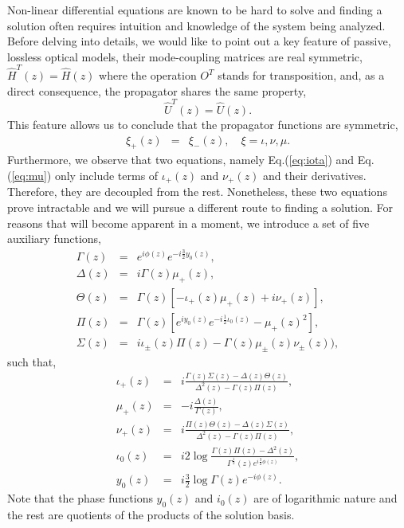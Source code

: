 \documentclass[9pt,twocolumn,twoside]{osajnl}
\begin{document}
Non-linear differential equations are known to be hard to solve and finding a solution 
often requires intuition and knowledge of the system being analyzed. 
Before delving into details, we would like to point out a key feature of passive, lossless optical models, their mode-coupling matrices are real symmetric, $\hat{H}^{T}(z) = \hat{H}(z)$ where the operation $O^{T}$ stands for transposition,  and, as a direct consequence, the propagator shares the same property,
\begin{equation}  
	\hat{U}^{T}(z)=\hat{U}(z).
\end{equation} 
This feature allows us to conclude that the propagator functions are symmetric,
\begin{eqnarray}
	\xi_{+}(z)&=&\xi_{-}(z), \quad \xi = \iota, \nu, \mu.
\end{eqnarray}
Furthermore, we observe that two equations, namely Eq.(\ref{eq:iota}) and Eq.(\ref{eq:mu}) only include terms of $\iota_{+}(z)$ and $\nu_{+}(z)$ and their derivatives. 
Therefore, they are decoupled from the rest. 
Nonetheless, these two equations prove intractable and we will pursue a different route to finding a solution.
For reasons that will become apparent in a moment, we introduce a set of five auxiliary functions,
\begin{eqnarray}
	\Gamma(z) &=& e^{i \phi(z)} e^{- i \frac{3}{2}  y_{0}(z)}, \\
	\Delta(z)&=& i \Gamma(z) \mu_{+}(z), \\
	\Theta(z)&=& \Gamma(z) \left[ -\iota_{+}(z) \mu_{+}(z) + i \nu_{+}(z) \right], \\
	\Pi(z)&=& \Gamma(z) \left[ e^{i y_0 (z)}e^{-i \frac{1}{2}\iota_0 (z)}
		-\mu_{+} (z)^2 \right], \\	
	\Sigma(z)&=& i \iota_{\pm}(z) \Pi(z) - \Gamma(z) \mu_{\pm} (z) \nu_{\pm}(z)), 
\end{eqnarray}
such that, 
\begin{eqnarray}
\iota_{+}(z) &=& i \frac{\Gamma(z)\Sigma(z) - \Delta(z)\Theta(z)}{\Delta^2(z)-\Gamma(z)\Pi(z)}, \\
\mu_{+}(z) &=& -i \frac{\Delta(z)}{\Gamma(z)},\\
\nu_{+}(z) &=& i \frac{\Pi(z)\Theta(z) - \Delta(z)\Sigma(z)}{\Delta^2(z)-\Gamma(z)\Pi(z)} ,\\
\iota_{0}(z) &=& i 2 \log \frac{\Gamma(z) \Pi(z) - \Delta^{2}(z)}{\Gamma^{\frac{1}{2}}(z) e^{i \frac{3}{2} \phi(z)}} , \\
y_{0}(z) &=& i \frac{3}{2} \log \Gamma(z) e^{- i \phi(z)} .
\end{eqnarray}
Note that the phase functions $y_0(z)$ and $i_0(z)$ are of logarithmic nature and the rest are quotients of the products of the solution basis. 
\end{document}
